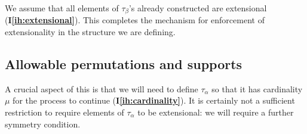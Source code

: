\documentclass[112pt]{article}
\theoremstyle{definition}
\theoremstyle{remark}
\newcommand{\ihref}[1]{(\textbf{I\ref{#1}})}
\newenvironment{annot}{\begin{center}\color{blue}\sl}{\end{center}}
\begin{document}
We assume that all elements of $\tau_\beta$'s already constructed are extensional \ihref{ih:extensional}.  This completes the mechanism for enforcement of extensionality in the structure we are defining.

\begin{comment}
\begin{annot}
  Again, the Lean formalisation only uses this for the construction of $\tau_\alpha$, and nowhere else.
  Of course, we need to remember the conclusion of proposition \ref{prop:extensionality} (namely, \ihref{ih:extensionality}), but that is all that is needed.
  In my opinion, the better way to phrase this part is that extensional elements at type $\alpha$ are candidates for inclusion in $\tau_\alpha$ since they satisfy \ihref{ih:extensionality}, and remove any mention of (pre-)extensional element from the inductive hypotheses; this also means we can specialise the definitions of (pre-)extensional elements to $\tau_\alpha$.
\end{annot}
\end{comment}

\subsection{Allowable permutations and supports}

A crucial aspect of this is that we will need to define $\tau_\alpha$ so that it has cardinality $\mu$ for the process to continue {\ihref{ih:cardinality}}.  It is certainly not a sufficient restriction to require elements of $\tau_\alpha$ to be extensional:  we will require a further symmetry condition.
\end{document}
